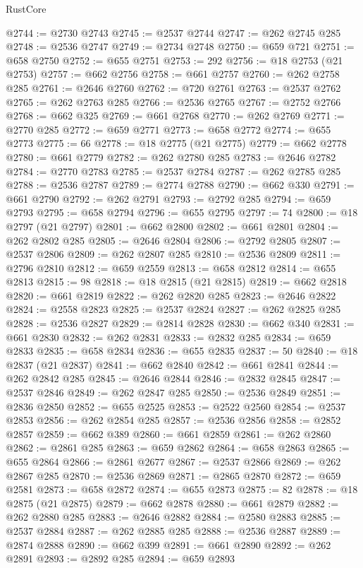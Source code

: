 \begin{lexlean}{RustCore}
\begin{coremodule}
@2744 := @2730 @2743
@2745 := @2537 @2744
@2747 := @262 @2745 @285
@2748 := @2536 @2747
@2749 := @2734 @2748
@2750 := @659 @721
@2751 := @658 @2750
@2752 := @655 @2751
@2753 := 292
@2756 := @18 @2753 (@21 @2753)
@2757 := @662 @2756
@2758 := @661 @2757
@2760 := @262 @2758 @285
@2761 := @2646 @2760
@2762 := @720 @2761
@2763 := @2537 @2762
@2765 := @262 @2763 @285
@2766 := @2536 @2765
@2767 := @2752 @2766
@2768 := @662 @325
@2769 := @661 @2768
@2770 := @262 @2769
@2771 := @2770 @285
@2772 := @659 @2771
@2773 := @658 @2772
@2774 := @655 @2773
@2775 := 66
@2778 := @18 @2775 (@21 @2775)
@2779 := @662 @2778
@2780 := @661 @2779
@2782 := @262 @2780 @285
@2783 := @2646 @2782
@2784 := @2770 @2783
@2785 := @2537 @2784
@2787 := @262 @2785 @285
@2788 := @2536 @2787
@2789 := @2774 @2788
@2790 := @662 @330
@2791 := @661 @2790
@2792 := @262 @2791
@2793 := @2792 @285
@2794 := @659 @2793
@2795 := @658 @2794
@2796 := @655 @2795
@2797 := 74
@2800 := @18 @2797 (@21 @2797)
@2801 := @662 @2800
@2802 := @661 @2801
@2804 := @262 @2802 @285
@2805 := @2646 @2804
@2806 := @2792 @2805
@2807 := @2537 @2806
@2809 := @262 @2807 @285
@2810 := @2536 @2809
@2811 := @2796 @2810
@2812 := @659 @2559
@2813 := @658 @2812
@2814 := @655 @2813
@2815 := 98
@2818 := @18 @2815 (@21 @2815)
@2819 := @662 @2818
@2820 := @661 @2819
@2822 := @262 @2820 @285
@2823 := @2646 @2822
@2824 := @2558 @2823
@2825 := @2537 @2824
@2827 := @262 @2825 @285
@2828 := @2536 @2827
@2829 := @2814 @2828
@2830 := @662 @340
@2831 := @661 @2830
@2832 := @262 @2831
@2833 := @2832 @285
@2834 := @659 @2833
@2835 := @658 @2834
@2836 := @655 @2835
@2837 := 50
@2840 := @18 @2837 (@21 @2837)
@2841 := @662 @2840
@2842 := @661 @2841
@2844 := @262 @2842 @285
@2845 := @2646 @2844
@2846 := @2832 @2845
@2847 := @2537 @2846
@2849 := @262 @2847 @285
@2850 := @2536 @2849
@2851 := @2836 @2850
@2852 := @655 @2525
@2853 := @2522 @2560
@2854 := @2537 @2853
@2856 := @262 @2854 @285
@2857 := @2536 @2856
@2858 := @2852 @2857
@2859 := @662 @389
@2860 := @661 @2859
@2861 := @262 @2860
@2862 := @2861 @285
@2863 := @659 @2862
@2864 := @658 @2863
@2865 := @655 @2864
@2866 := @2861 @2677
@2867 := @2537 @2866
@2869 := @262 @2867 @285
@2870 := @2536 @2869
@2871 := @2865 @2870
@2872 := @659 @2581
@2873 := @658 @2872
@2874 := @655 @2873
@2875 := 82
@2878 := @18 @2875 (@21 @2875)
@2879 := @662 @2878
@2880 := @661 @2879
@2882 := @262 @2880 @285
@2883 := @2646 @2882
@2884 := @2580 @2883
@2885 := @2537 @2884
@2887 := @262 @2885 @285
@2888 := @2536 @2887
@2889 := @2874 @2888
@2890 := @662 @399
@2891 := @661 @2890
@2892 := @262 @2891
@2893 := @2892 @285
@2894 := @659 @2893

\end{coremodule}
\end{lexlean}
